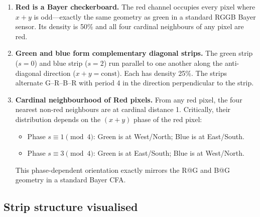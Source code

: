 \documentclass[a4paper,11pt]{article}
\begin{document}
\begin{enumerate}
\item \textbf{Red is a Bayer checkerboard.}  The red channel occupies
  every pixel where $x+y$ is odd---exactly the same geometry as green in
  a standard RGGB Bayer sensor.  Its density is 50\% and all four
  cardinal neighbours of any pixel are red.
  
\item \textbf{Green and blue form complementary diagonal strips.}  The
  green strip ($s=0$) and blue strip ($s=2$) run parallel to one another
  along the anti-diagonal direction ($x+y=\text{const}$).  Each has
  density 25\%.  The strips alternate G--R--B--R with period 4 in the
  direction perpendicular to the strip.

\item \textbf{Cardinal neighbourhood of Red pixels.}  From any red pixel, the four nearest
  non-red neighbours are at cardinal distance 1.  Critically, their distribution depends
  on the $(x+y)$ phase of the red pixel:
  \begin{itemize}
    \item Phase $s \equiv 1 \pmod{4}$: Green is at West/North; Blue is at East/South.
    \item Phase $s \equiv 3 \pmod{4}$: Green is at East/South; Blue is at West/North.
  \end{itemize}
  This phase-dependent orientation exactly mirrors the R@G and B@G geometry in a standard Bayer CFA.
\end{enumerate}
\subsection{Strip structure visualised}
\end{document}
